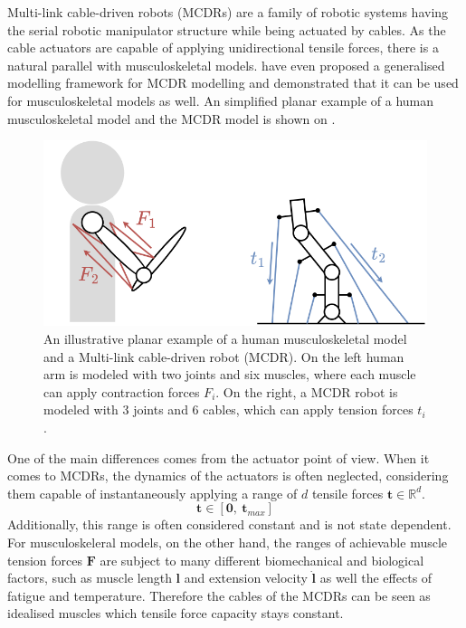 Multi-link cable-driven robots (MCDRs) \cite{Wang2019} are a family of robotic systems having the serial robotic manipulator structure while being actuated by cables. As the cable actuators are capable of applying unidirectional tensile forces, there is a natural parallel with musculoskeletal models. \citet{Lau2013} have even proposed a generalised modelling framework for MCDR modelling and demonstrated that it can be used for musculoskeletal models as well. An simplified planar example of a human musculoskeletal model and the MCDR model is shown on .

\begin{figure}
    \centering
    \includegraphics[width=\linewidth]{Chapters/imgs/muscle_mcdrs.png}
    \caption{An illustrative planar example of a human musculoskeletal model and a Multi-link cable-driven robot (MCDR). On the left human arm is modeled with two joints and six muscles, where each muscle can apply contraction forces $F_i$. On the right, a MCDR robot is modeled with 3 joints and 6 cables, which can apply tension forces $t_i$.  }
    \label{fig:muscle_mcdrs}
\end{figure}


 



One of the main differences comes from the actuator point of view. When it comes to MCDRs, the dynamics of the actuators is often neglected, considering them capable of instantaneously applying a range of $d$ tensile forces $\bm{t}\in\mathbb{R}^d$.
\begin{equation}
    \bm{t} \in [\bm{0},~\bm{t}_{max}]
\end{equation}
Additionally, this range is often considered constant and is not state dependent. For musculoskeleral models, on the other hand, the ranges of achievable muscle tension forces $\bm{F}$ are subject to many different biomechanical and biological factors, such as muscle length $\bm{l}$ and extension velocity $\dot{\bm{l}}$ as well the effects of fatigue and temperature.
Therefore the cables of the MCDRs can be seen as idealised muscles which tensile force capacity stays constant. 

